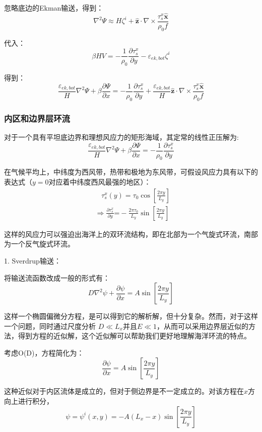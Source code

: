 \documentclass{article}
\begin{document}
忽略底边的Ekman输送，得到：
$${{\nabla }^{2}}\Psi \approx H{{\zeta }^{i}}+\mathbf{\hat{z}}\cdot \nabla \times \frac{\tau _{s}^{x}\mathbf{\hat{x}}}{{{\rho }_{0}}f}$$

代入：
$$\beta HV=-\frac{1}{{{\rho }_{0}}}\frac{\partial \tau _{s}^{x}}{\partial y}-{{\varepsilon }_{ek,bot}}{{\zeta }^{i}}$$

得到：
$$\frac{{{\varepsilon }_{ek,bot}}}{H}{{\nabla }^{2}}\Psi +\beta \frac{\partial \Psi }{\partial x}=-\frac{1}{{{\rho }_{0}}}\frac{\partial \tau _{s}^{x}}{\partial y}+\frac{{{\varepsilon }_{ek,bot}}}{H}\mathbf{\hat{z}}\cdot \nabla \times \frac{\tau _{s}^{x}\mathbf{\hat{x}}}{{{\rho }_{0}}f}$$

\subsubsection{内区和边界层环流}
对于一个具有平坦底边界和理想风应力的矩形海域，其定常的线性正压解为:
$$\frac{{{\varepsilon }_{ek,bot}}}{H}{{\nabla }^{2}}\Psi +\beta \frac{\partial \Psi }{\partial x}=-\frac{1}{{{\rho }_{0}}}\frac{\partial \tau _{s}^{x}}{\partial y}$$

在气候平均上，中纬度为西风带，热带和极地为东风带，可假设风应力具有以下的表达式（$y=0$对应着中纬度西风最强的地区）：
\begin{align}
  & \ \ \ \ \tau _{s}^{x}(y)={{\tau }_{0}}\cos \left[ \frac{2\pi y}{{{L}_{y}}} \right] \\ 
 & \Rightarrow \frac{\partial \tau _{s}^{x}}{\partial y}\text{=}-\frac{2\pi {{\tau }_{0}}}{{{L}_{y}}}\sin\left[ \frac{2\pi y}{{{L}_{y}}} \right]\ \  
\end{align}

这样的风应力可以强迫出海洋上的双环流结构，即在北部为一个气旋式环流，南部为一个反气旋式环流。

1. Sverdrup输送：

将输送流函数改成一般的形式有：
$$D{{\nabla }^{2}}\psi +\frac{\partial \psi }{\partial x}=A\sin \left[ \frac{2\pi y}{{{L}_{y}}}\right] $$

这样一个椭圆偏微分方程，是可以得到它的解析解，但十分复杂。然而，对于这样一个问题，同时通过尺度分析 $D \ll L_x$并且$E \ll 1$，从而可以采用边界层近似的方法，得到方程的近似解，这个近似解可以帮助我们更好地理解海洋环流的特点。

考虑O(D)，方程简化为：
$$\frac{\partial \psi }{\partial x}=A\sin \left[ \frac{2\pi y}{{{L}_{y}}} \right]$$

这种近似对于内区流体是成立的，但对于侧边界是不一定成立的。对该方程在$x$方向上进行积分，
$$\psi ={{\psi }^{i}}\left( x,y \right)=-A({{L}_{x}}-x)\sin \left[ \frac{2\pi y}{{{L}_{y}}} \right]$$
\end{document}
